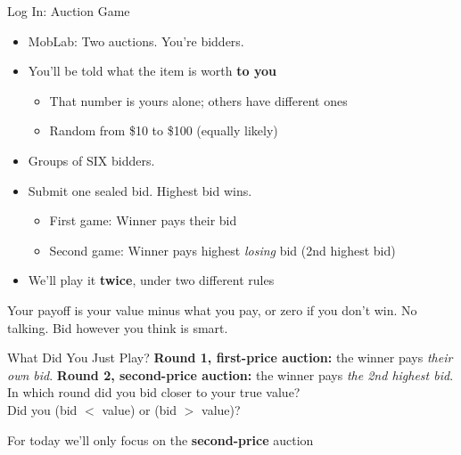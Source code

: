 \begin{frame}{Log In: Auction Game}
\begin{itemize}
    \item MobLab: Two auctions. You're bidders.
    \item You'll be told what the item is worth \textbf{to you}
    \begin{itemize}
        \item That number is yours alone; others have different ones
        \item Random from \$10 to \$100 (equally likely)
    \end{itemize}
    \item Groups of SIX bidders.
    \item Submit one sealed bid. Highest bid wins.
    \begin{itemize}
        \item First game: Winner pays their bid
        \item Second game: Winner pays highest \textit{losing} bid (2nd highest bid)
    \end{itemize}
    \item We'll play it \textbf{twice}, under two different rules
\end{itemize}
\bsk
Your payoff is your value minus what you pay, or zero if you don't win.
\vfill
\centering
No talking. Bid however you think is smart.
\vspace{-0.3in}
\end{frame}

\begin{frame}{What Did You Just Play?}
\textbf{Round 1, first-price auction:} the winner pays \textit{their own bid}.
\bsk
\textbf{Round 2, second-price auction:} the winner pays \textit{the 2nd highest bid}.
\bsk
\vfill
In which round did you bid closer to your true value?\\
Did you (bid $<$ value) or (bid $>$ value)?
\vspace{1.1in}

For today we'll only focus on the \textbf{second-price} auction
\end{frame}

